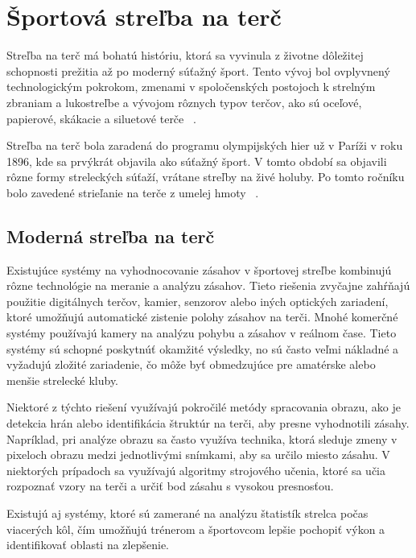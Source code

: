 \section {Športová streľba na terč}
Streľba na terč má bohatú históriu, ktorá sa vyvinula z životne dôležitej schopnosti prežitia 
až po moderný súťažný šport. Tento vývoj bol ovplyvnený technologickým pokrokom, zmenami v 
spoločenských postojoch k strelným zbraniam a lukostreľbe a vývojom rôznych typov terčov, ako 
sú oceľové, papierové, skákacie a siluetové terče ~\cite{target_shooting}.

Streľba na terč bola zaradená do programu olympijských hier už v Paríži v roku 1896, kde sa 
prvýkrát objavila ako súťažný šport. V tomto období sa objavili rôzne formy streleckých súťaží, 
vrátane streľby na živé holuby. Po tomto ročníku bolo zavedené strieľanie na terče z umelej 
hmoty ~\cite{target_shooting_olympic}.

\subsection{Moderná streľba na terč}
Existujúce systémy na vyhodnocovanie zásahov v športovej streľbe kombinujú rôzne technológie na 
meranie a analýzu zásahov. Tieto riešenia zvyčajne zahŕňajú použitie digitálnych terčov, kamier, 
senzorov alebo iných optických zariadení, ktoré umožňujú automatické zistenie polohy zásahov na terči. 
Mnohé komerčné systémy používajú kamery na analýzu pohybu a zásahov v reálnom čase. Tieto systémy 
sú schopné poskytnúť okamžité výsledky, no sú často veľmi nákladné a vyžadujú zložité zariadenie, 
čo môže byť obmedzujúce pre amatérske alebo menšie strelecké kluby.

Niektoré z týchto riešení využívajú pokročilé metódy spracovania obrazu, ako je detekcia hrán alebo 
identifikácia štruktúr na terči, aby presne vyhodnotili zásahy. Napríklad, pri analýze obrazu sa často 
využíva technika, ktorá sleduje zmeny v pixeloch obrazu medzi jednotlivými snímkami, aby sa určilo 
miesto zásahu. V niektorých prípadoch sa využívajú algoritmy strojového učenia, ktoré sa učia rozpoznať 
vzory na terči a určiť bod zásahu s vysokou presnosťou.

Existujú aj systémy, ktoré sú zamerané na analýzu štatistík strelca počas viacerých kôl, čím umožňujú 
trénerom a športovcom lepšie pochopiť výkon a identifikovať oblasti na zlepšenie.


